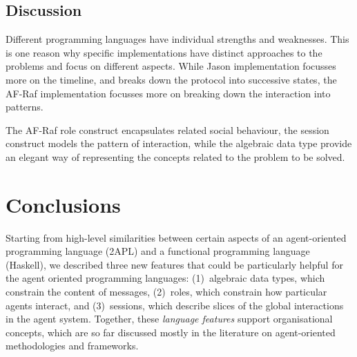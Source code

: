 \documentclass[a4paper,12pt,oneside,fleqn]{book} %
\begin{document}




\section{Discussion} %
Different programming languages have individual strengths and weaknesses.
This is one reason why specific implementations have distinct approaches to
the problems and focus on different aspects. While Jason implementation
focusses more on the timeline, and breaks down the protocol into successive
states, the AF-Raf implementation focusses more on breaking down the
interaction into patterns.

The AF-Raf role construct encapsulates related social behaviour, the
session construct models the pattern of interaction, while the algebraic
data type provide an elegant way of representing the concepts related to
the problem to be solved. 

\chapter{Conclusions}\label{ch:conc} %

Starting from high-level similarities between certain aspects of an
agent-oriented programming language (2APL) and a functional programming
language (Haskell), we described three new features that could be
particularly helpful for the agent oriented programming languages:
(1)~algebraic data types, which constrain the content of messages,
(2)~roles, which constrain how particular agents interact, and
(3)~sessions, which describe slices of the global interactions in the agent
system. Together, these \emph{language features} support organisational
concepts, which are so far discussed mostly in the literature on
agent-oriented methodologies and frameworks.
\end{document}
